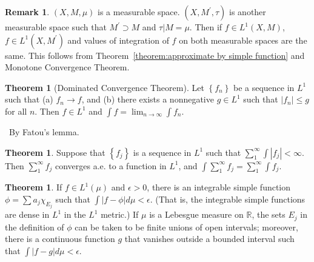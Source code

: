 \documentclass[12pt,a4paper]{book}
\newenvironment{prooff}{{\noindent\it\textcolor{cyan!40!black}{Proof}:}\,}{\par}
\newcommand{\p}{^{\prime}}
\theoremstyle{definition}
\newtheorem{theo}[defn]{Theorem}
\newtheorem{rema}[defn]{Remark}
\begin{document}
\begin{rema}
    $(X,M,\mu)$ is a measurable space. $(X,M\p,\tau)$ is another measurable space such that $M\p\supset M$ and $\tau|M=\mu$. Then if $f\in L^1(X,M)$, $f\in L^1(X,M\p)$ and
    values of integration of $f$ on both measurable spaces are the same.
    This follows from Theorem~\ref{theorem:approximate by simple function} and Monotone Convergence Theorem.
\end{rema}
\begin{theo}[Dominated Convergence Theorem]
    Let $\left\{f_n\right\}$ be a sequence in $L^1$ such that (a) $f_n \rightarrow f$, and (b) there exists a nonnegative $g \in L^1$ such that $\left|f_n\right| \leq g$ for all $n$. Then $f \in L^1$ and $\int f=\lim _{n \rightarrow \infty} \int f_n$.
\end{theo}
\begin{prooff}
    By Fatou's lemma.
\end{prooff}
\begin{theo}
    Suppose that $\left\{f_j\right\}$ is a sequence in $L^1$ such that $\sum_1^{\infty} \int\left|f_j\right|<\infty$. Then $\sum_1^{\infty} f_j$ converges a.e. to a function in $L^1$, and $\int \sum_1^{\infty} f_j=\sum_1^{\infty} \int f_j$.
\end{theo}
\begin{theo}
    If $f \in L^1(\mu)$ and $\epsilon>0$, there is an integrable simple function $\phi=\sum a_j \chi_{E_j}$
    such that $\int|f-\phi| d \mu<\epsilon$. (That is, the integrable simple functions are dense in $L^1$ in the $L^1$ metric.)
    If $\mu$ is a Lebesgue measure on $\mathbb{R}$, the sets $E_j$ in the definition of $\phi$ can be taken to be finite unions of open intervals; moreover, there is a continuous function $g$ that vanishes outside a bounded interval such that $\int|f-g| d \mu<\epsilon$.
\end{theo}
\end{document}

